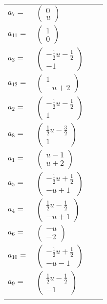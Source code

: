 \documentclass[1p]{elsarticle_modified}
\theoremstyle{definition}
\begin{document}
\begin{tabular}{m{7pt} m{180pt} m{7pt} m{180pt} }
\flushright $a_{7}=$&$\begin{pmatrix}0\\u\end{pmatrix}$ \\
\flushright $a_{11}=$&$\begin{pmatrix}1\\0\end{pmatrix}$ \\
\flushright $a_{3}=$&$\begin{pmatrix}-\frac{1}{2} u-\frac{1}{2}\\-1\end{pmatrix}$ \\
\flushright $a_{12}=$&$\begin{pmatrix}1\\- u+2\end{pmatrix}$ \\
\flushright $a_{2}=$&$\begin{pmatrix}-\frac{1}{2} u-\frac{1}{2}\\1\end{pmatrix}$ \\
\flushright $a_{8}=$&$\begin{pmatrix}\frac{1}{2} u-\frac{3}{2}\\1\end{pmatrix}$ \\
\flushright $a_{1}=$&$\begin{pmatrix}u-1\\u+2\end{pmatrix}$ \\
\flushright $a_{5}=$&$\begin{pmatrix}-\frac{1}{2} u+\frac{1}{2}\\- u+1\end{pmatrix}$ \\
\flushright $a_{4}=$&$\begin{pmatrix}\frac{1}{2} u-\frac{1}{2}\\- u+1\end{pmatrix}$ \\
\flushright $a_{6}=$&$\begin{pmatrix}- u\\-2\end{pmatrix}$ \\
\flushright $a_{10}=$&$\begin{pmatrix}-\frac{1}{2} u+\frac{1}{2}\\- u-1\end{pmatrix}$ \\
\flushright $a_{9}=$&$\begin{pmatrix}\frac{1}{2} u-\frac{1}{2}\\-1\end{pmatrix}$\\&\end{tabular}
\end{document}
